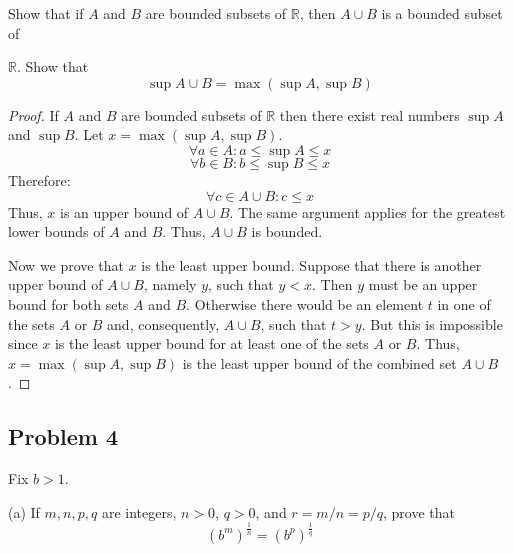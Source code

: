 \documentclass{article}
\begin{document}
\begin{tcolorbox}
Show that if $A$ and $B$ are bounded subsets of $\mathbb{R}$, then $A \cup B$ is a bounded subset of
\end{tcolorbox}

$\mathbb{R}$. Show that
$$\sup A \cup B = \max (\sup A, \sup B)$$

\begin{proof}
If $A$ and $B$ are bounded subsets of $\mathbb{R}$ then there exist real numbers $\sup A$ and $\sup B$. Let $x = \max (\sup A, \sup B)$.
$$\forall a \in A : a \leq \sup A \leq x$$
$$\forall b \in B : b \leq \sup B \leq x$$
Therefore:
$$\forall c \in A \cup B : c \leq x$$
Thus, $x$ is an upper bound of $A \cup B$. The same argument applies for the greatest lower bounds of $A$ and $B$. Thus, $A \cup B$ is bounded.

Now we prove that $x$ is the least upper bound. Suppose that there is another upper bound of $A \cup B$, namely $y$, such that $y<x$. Then $y$ must be an upper bound for both sets $A$ and $B$. Otherwise there would be an element $t$ in one of the sets $A$ or $B$ and, consequently, $A \cup B$, such that $t > y$. But this is impossible since $x$ is the least upper bound for at least one of the sets $A$ or $B$. Thus, $x = \max (\sup A, \sup B)$ is the least upper bound of the combined set $A \cup B$.
\end{proof}

\subsection*{Problem 4}

\begin{tcolorbox}
Fix $b>1$.

(a) If $m, n, p, q$ are integers, $n > 0$, $q > 0$, and $r = m/n = p/q$, prove that
\begin{equation} \label{eq:1}
(b^m)^{\frac{1}{n}} = (b^p)^{\frac{1}{q}}
\end{equation}
\end{tcolorbox}
\end{document}
